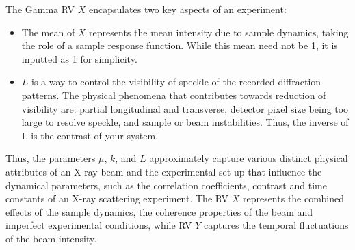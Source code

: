 \documentclass[11pt]{article}
\theoremstyle{definition}
\begin{document}
\begin{itemize}
The Gamma RV \( X \) encapsulates two key aspects of an experiment: 
\begin{itemize}
    \item The mean of \( X \) represents the mean intensity due to sample dynamics, taking the role of a sample response function. While this mean need not be 1, it is inputted as 1 for simplicity.
    \item $L$ is a way to control the visibility of speckle of the recorded diffraction patterns. The physical phenomena that contributes towards reduction of visibility are: partial longitudinal and transverse, detector pixel size being too large to resolve speckle, and sample or beam instabilities. Thus, the inverse of L is the contrast of your system. 
\end{itemize}

Thus, the parameters \(\mu\), \( k \), and \( L \) approximately capture various distinct physical attributes of an X-ray beam and the experimental set-up that influence the dynamical parameters, such as the correlation coefficients, contrast and time constants of an X-ray scattering experiment. The RV \( X \) represents the combined effects of the sample dynamics, the coherence properties of the beam and imperfect experimental conditions, while RV \( Y \) captures the temporal fluctuations of the beam intensity.


\end{itemize}
\end{document}
